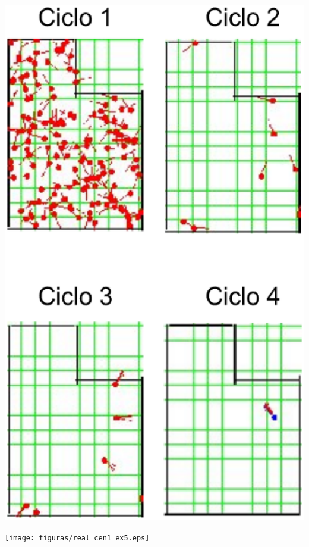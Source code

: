 {\centering
\includegraphics[scale=0.4]{figuras/cen1_ex5.eps}
\label{img:cen1_ex5}
\par}

{\centering
\texttt{[image: figuras/real\_cen1\_ex5.eps]}
\label{img:real_cen1_ex5}
\par}

